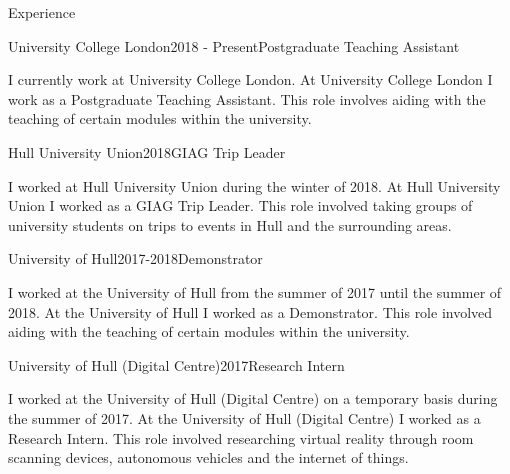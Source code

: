 \documentclass{cv}
\begin{document}
\begin{rSection}{Experience}

\begin{rSubsection}{University College London}{2018 - Present}{Postgraduate Teaching Assistant}{}

\item I currently work at University College London. At University College London I work as a Postgraduate Teaching Assistant. This role involves aiding with the teaching of certain modules within the university.

\end{rSubsection}


\begin{rSubsection}{Hull University Union}{2018}{GIAG Trip Leader}{}

\item I worked at Hull University Union during the winter of 2018. At Hull University Union I worked as a GIAG Trip Leader. This role involved taking groups of university students on trips to events in Hull and the surrounding areas.

\end{rSubsection}


\begin{rSubsection}{University of Hull}{2017-2018}{Demonstrator}{}

\item I worked at the University of Hull from the summer of 2017 until the summer of 2018. At the University of Hull I worked as a Demonstrator. This role involved aiding with the teaching of certain modules within the university.

\end{rSubsection}


\begin{rSubsection}{University of Hull (Digital Centre)}{2017}{Research Intern}{}

\item I worked at the University of Hull (Digital Centre) on a temporary basis during the summer of 2017. At the University of Hull (Digital Centre) I worked as a Research Intern. This role involved researching virtual reality through room scanning devices, autonomous vehicles and the internet of things.


\end{rSubsection}
\end{rSection}
\end{document}
